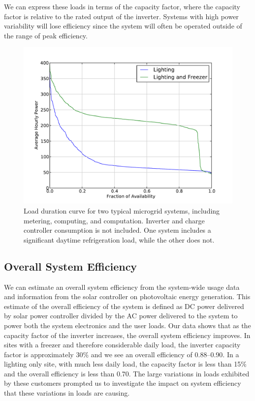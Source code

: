 \documentclass[conference]{IEEEtran}
\begin{document}
We can express these loads in terms of the capacity factor,
where the capacity factor is relative to the rated output
of the inverter.
Systems with high power variability will lose efficiency since
the system will often be operated outside of the range of
peak efficiency.

\begin{figure}[h]
\begin{center}
\includegraphics[trim = 0.0in 0.2in 0.0in 0.5in, clip, width=\columnwidth]
{figures/two_ldc.pdf}
\end{center}
\caption{Load duration curve for two typical microgrid systems,
including metering, computing, and computation.
Inverter and charge controller consumption is not included.
One system includes a significant daytime refrigeration load,
while the other does not.
}
\label{two_ldc}
\end{figure}

\subsection{Overall System Efficiency}

We can estimate an overall system efficiency from the
system-wide usage data and information from the solar
controller on photovoltaic energy generation.
This estimate of the overall efficiency of the system
is defined as DC power delivered by solar
power controller divided by the AC power delivered to the system
to power both the system electronics and the user loads.
Our data shows that as the capacity factor of the inverter
increases, the overall system efficiency improves.
In sites with a freezer and therefore considerable daily load,
the inverter capacity factor is approximately 30\% and
we see an overall efficiency of 0.88--0.90.
In a lighting only site, with much less daily load, the capacity
factor is less than 15\% and the overall efficiency
is less than 0.70.
The large variations in loads exhibited by these customers prompted
us to investigate the impact on system efficiency that these
variations in loads are causing.
\end{document}
